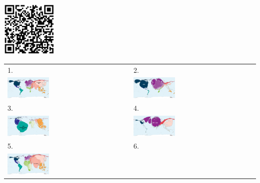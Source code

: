 \begin{center}
\includegraphics[width=0.2\textwidth]{maps/qr.png}
\end{center}

\linespread{1.2}

\begin{center}
\LARGE
\begin{tabularx}{0.75\textwidth}{XX}
    1. & 2. \\
    \includegraphics[width=0.35\textwidth]{maps/picture_1.png} &
    \includegraphics[width=0.35\textwidth]{maps/picture_2.png} \\
    3. & 4. \\
    \includegraphics[width=0.35\textwidth]{maps/picture_3.png} &
    \includegraphics[width=0.35\textwidth]{maps/picture_4.png} \\
    5. & 6. \\
    \includegraphics[width=0.35\textwidth]{maps/picture_5.png} &

\end{tabularx}
\end{center}
